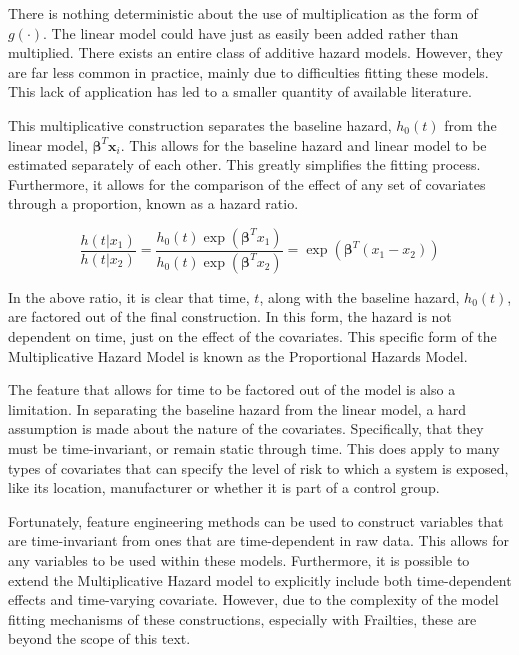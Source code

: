 There is nothing deterministic about the use of multiplication as the form of $g(\cdot)$. The linear model could have just as easily been added rather than multiplied. There exists an entire class of additive hazard models\cite{Lin1997}. However, they are far less common in practice, mainly due to difficulties fitting these models\cite{Boshuizen2010}. This lack of application has led to a smaller quantity of available literature.

This multiplicative construction separates the baseline hazard, $h_0(t)$ from the linear model, $\boldsymbol\beta^T \textbf{x}_i$. This allows for the baseline hazard and linear model to be estimated separately of each other. This greatly simplifies the fitting process. Furthermore, it allows for the comparison of the effect of any set of covariates through a proportion, known as a hazard ratio.

$$ \frac{h(t|x_1)}{h(t|x_2)} = \frac{h_0(t) \exp(\boldsymbol\beta^T x_1)}{h_0(t) \exp(\boldsymbol\beta^T x_2)}  = \exp( \boldsymbol\beta^T(x_1 - x_2) )$$

In the above ratio, it is clear that time, $t$, along with the baseline hazard, $h_0(t)$, are factored out of the final construction. In this form, the hazard is not dependent on time, just on the effect of the covariates. This specific form of the Multiplicative Hazard Model is known as the Proportional Hazards Model.

The feature that allows for time to be factored out of the model is also a limitation. In separating the baseline hazard from the linear model, a hard assumption is made about the nature of the covariates. Specifically, that they must be time-invariant, or remain static through time. This does apply to many types of covariates that can specify the level of risk to which a system is exposed, like its location, manufacturer or whether it is part of a control group. 

Fortunately, feature engineering methods can be used to construct variables that are time-invariant from ones that are time-dependent in raw data. This allows for any variables to be used within these models. Furthermore, it is possible to extend the Multiplicative Hazard model to explicitly include both time-dependent effects and time-varying covariate\cite{Dekker2008}. However, due to the complexity of the model fitting mechanisms of these constructions, especially with Frailties, these are beyond the scope of this text. 


